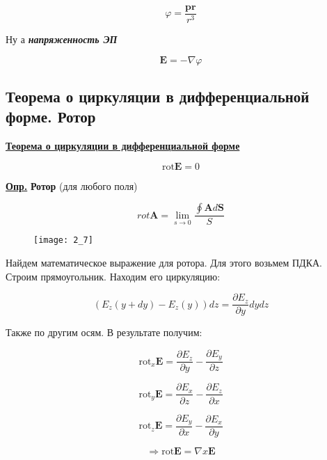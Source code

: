 \begin{equation}
\varphi = \frac{\mathbf{p r}}{r^{3}}
\end{equation}

Ну а \textit{\textbf{напряженность ЭП}}

\begin{equation}
\mathbf{E} = - \nabla \varphi
\end{equation}

\subsection{Теорема о циркуляции в дифференциальной форме. Ротор}

\colorbox{faded}{\underline{\textbf{Теорема о циркуляции в дифференциальной форме}}}

\begin{equation}
\mathrm{rot} \mathbf{E} = 0
\end{equation} 

\colorbox{faded}{\underline{\textbf{Опр.}}} \textbf{Ротор} (для любого поля)

\begin{equation}
rot \mathbf{A} = \lim_{s \rightarrow 0} \frac{\oint \mathbf{A} d \mathbf{S}}{S}
\end{equation} 

\begin{figure}[!ht]
\centering
 \texttt{[image: 2\_7]}     
 \label{fig:my_label}
 \caption{}
\end{figure}

Найдем математическое выражение для ротора. Для этого возьмем ПДКА. Строим прямоугольник. Находим его циркуляцию:

$$(E_{z} (y +dy) - E_{z} (y)) dz = \frac{\partial E_{z}}{\partial y} dy dz$$

Также по другим осям. В результате получим:

$$\mathrm{rot}_{x} \mathbf{E} = \frac{\partial E_{z}}{\partial y} - \frac{\partial E_{y}}{\partial z}$$

$$\mathrm{rot}_{y} \mathbf{E} = \frac{\partial E_{x}}{\partial z} - \frac{\partial E_{z}}{\partial x}$$

$$\mathrm{rot}_{z} \mathbf{E} = \frac{\partial E_{y}}{\partial x} - \frac{\partial E_{x}}{\partial y}$$

\begin{equation}
\Rightarrow \mathrm{rot} \mathbf{E} = \nabla x \mathbf{E} 
\end{equation}

